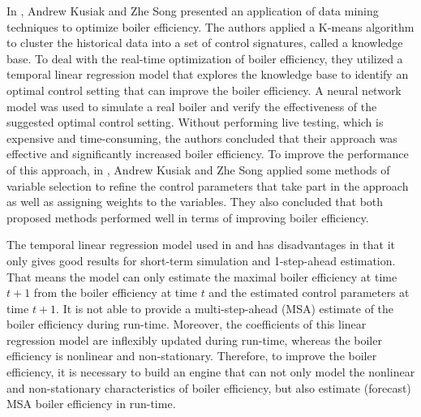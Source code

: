 In \cite{boi:ref_09}, Andrew Kusiak and Zhe Song presented an application of data mining techniques to optimize boiler efficiency. The authors applied a K-means algorithm to cluster the historical data into a set of control signatures, called a knowledge base. To deal with the real-time optimization of boiler efficiency, they utilized a temporal linear regression model that explores the knowledge base to identify an optimal control setting that can improve the boiler efficiency. A neural network model was used to simulate a real boiler and verify the effectiveness of the suggested optimal control setting. Without performing live testing, which is expensive and time-consuming, the authors concluded that their approach was effective and significantly increased boiler efficiency. To improve the performance of this approach, in \cite{boi:ref_12}, Andrew Kusiak and Zhe Song applied some methods of variable selection to refine the control parameters that take part in the approach as well as assigning weights to the variables. They also concluded that both proposed methods performed well in terms of improving boiler efficiency.

The temporal linear regression model used in \cite{boi:ref_09} and \cite{boi:ref_12} has disadvantages in that it only gives good results for short-term simulation and 1-step-ahead estimation. That means the model can only estimate the maximal boiler efficiency at time $t+1$ from the boiler efficiency at time $t$ and the estimated control parameters at time $t+1$. It is not able to provide a multi-step-ahead (MSA) estimate of the boiler efficiency during run-time. Moreover, the coefficients of this linear regression model are inflexibly updated during run-time, whereas the boiler efficiency is nonlinear and non-stationary. Therefore, to improve the boiler efficiency, it is necessary to build an engine that can not only model the nonlinear and non-stationary characteristics of boiler efficiency, but also estimate (forecast) MSA boiler efficiency in run-time.  

